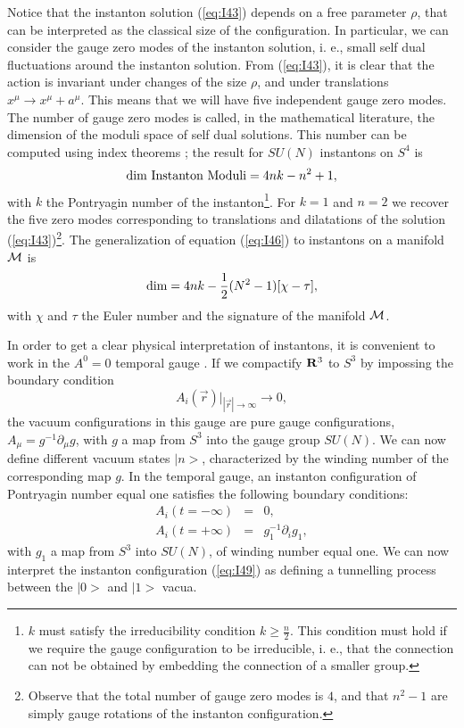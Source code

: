 Notice that the instanton solution (\ref{eq:I43}) depends on a
free parameter $\rho$, that can be interpreted as the classical
size of the configuration. In particular, we can consider the
gauge zero modes of the instanton solution, i. e., small self
dual fluctuations around the instanton solution. From
(\ref{eq:I43}), it is clear that the action is invariant under changes of
the size $\rho$, and under translations $x^{\mu} \rightarrow
x^{\mu} + a^{\mu}$. This means that we will have five independent
gauge zero modes. The number of gauge zero modes is called, in
the mathematical literature, the dimension of the moduli space of
self dual solutions. This number can be computed \cite{tHpseudo,JR,At} using index
theorems \cite{AHS}; the result for $SU(N)$ instantons on $S^4$ is 
\begin{equation}
\hbox {dim Instanton Moduli} = 4 n k - n^2+1,
\label{eq:I46}
\end{equation}
with $k$ the Pontryagin number of the instanton\footnote{$k$ must
satisfy the irreducibility condition $k \geq \frac {n}{2}$. This condition 
must hold if we require the gauge configuration to be irreducible, i. e., that 
the connection can not be obtained by embedding the connection of a smaller group.}. For
$k=1$ and $n=2$ we recover the five zero modes corresponding to
translations and dilatations of the solution (\ref{eq:I43})\footnote{Observe that the total
number of gauge zero modes is $4$, and that $n^2-1$ are simply
gauge rotations of the instanton configuration.}. The
generalization of equation (\ref{eq:I46}) to instantons on a
manifold ${\cal M}$ is
\begin{equation}
\hbox {dim} = 4 n k - \frac {1}{2} (N^2-1) [\chi- \tau],
\label{eq:I47}
\end{equation}
with $\chi$ and $\tau$ the Euler number and the signature of the
manifold ${\cal M}$.
  
In order to get a clear physical interpretation of instantons, it
is convenient to work in the $A^0=0$ temporal gauge \cite{cl,jackiw,CDG}. If we
compactify ${\bf R}^3$ to $S^3$ by impossing the boundary
condition
\begin{equation}
A_i(\vec{r})|_{|\vec{r}| \rightarrow \infty} \rightarrow 0,
\label{eq:I48}
\end{equation}
the vacuum configurations in this gauge are pure gauge
configurations, $A_{\mu} = g^{-1} \partial_{\mu} g$, with $g$ a
map from $S^3$ into the gauge group $SU(N)$. We can now define
different vacuum states $|n>$, characterized by the winding
number of the corresponding map $g$. In the temporal gauge, an
instanton configuration of Pontryagin number equal one satisfies
the following boundary conditions:
\begin{eqnarray}
A_i (t = - \infty) & = & 0, \nonumber \\
A_i (t = + \infty) & = & g_1^{-1} \partial_i g_1,
\label{eq:I49}
\end{eqnarray}
with $g_1$ a map from $S^3$ into $SU(N)$, of winding number equal
one. We can now interpret the instanton configuration
(\ref{eq:I49}) as defining a tunnelling process between the $|0>$
and $|1>$ vacua. 
  
